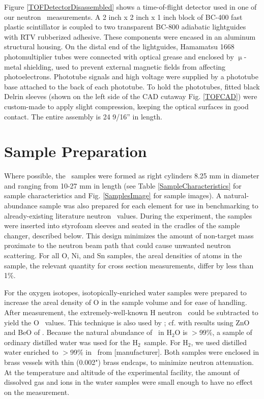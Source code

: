 Figure \ref{TOFDetectorDisassembled} shows a time-of-flight detector used in one
of our neutron \tot\ measurements. A 2 inch x 2 inch x 1 inch block of BC-400 fast
plastic scintillator is coupled to two transparent
BC-800 adiabatic lightguides with RTV rubberized adhesive. These components were encased
in an aluminum structural housing. On the distal end of the lightguides, Hamamatsu 1668
photomultiplier tubes were connected with optical grease and enclosed by
$\upmu$-metal shielding, used to prevent external magnetic fields from affecting photoelectrons.
Phototube signals and high voltage were supplied by a phototube base attached to the back of each
phototube. To hold the phototubes, fitted black Delrin sleeves (shown on the
left side of the CAD cutaway Fig. \ref{TOFCAD}) were custom-made to apply slight
compression, keeping the optical surfaces in good contact. The entire assembly
is 24 9/16'' in length.

\section{Sample Preparation}
Where possible, the \tot\ samples were formed as right
cylinders 8.25 mm in diameter and ranging from 10-27 mm in length (see
Table \ref{SampleCharacteristics} for sample characteristics and Fig. \ref{SamplesImage}
for sample images). A natural-abundance sample
was also prepared for each element for use in benchmarking to already-existing
literature neutron \tot\ values. During the experiment, the samples were inserted
into styrofoam sleeves and seated in the cradles of the sample
changer, described below. This design minimizes the amount of non-target mass proximate to the
neutron beam path that could cause unwanted neutron scattering. For all O, Ni,
and Sn samples, the areal densities of atoms in the sample, the relevant quantity for cross section
measurements, differ by less than 1\%.

For the oxygen isotopes, isotopically-enriched water samples were prepared to
increase the areal density of O in the sample volume and for ease of handling.
After measurement, the
extremely-well-known H neutron \tot\ could be subtracted to yield the O \tot\ values.
This technique is also used by \cite{Vaughn1965, Salisbury1965}; cf.  with
results using ZnO and BeO of \cite{Finlay1993}.
Because the natural abundance of \oSix\ in H$_{2}$O is $>$99\%, a sample of
ordinary distilled water was used for the H$_{2}$\oSix\ sample. For H$_{2}$\oEight,
we used distilled water enriched to $>$99\% in \oEight\ from
[manufacturer]. Both samples were enclosed in brass vessels with thin
(0.002") brass endcaps, to minimize neutron attenuation. At the temperature and
altitude of the experimental facility, the amount of dissolved gas and ions
in the water samples were small enough to have no effect on the measurement.

